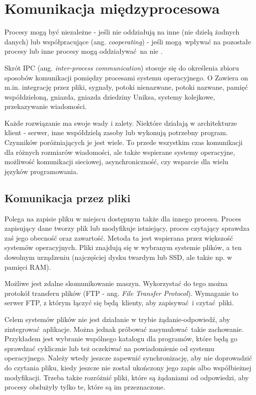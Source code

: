 \chapter{Komunikacja międzyprocesowa}

Procesy mogą być niezależne - jeśli nie oddziałują na inne (nie dzielą żadnych danych) lub współpracujące (ang. \textit{cooperating}) - jeśli mogą wpływać na pozostałe procesy lub inne procesy mogą oddziaływać na nie \cite{Silber06}.

Skrót IPC (ang. \textit{inter-process communication}) stosuje się do określenia zbioru sposobów komunikacji pomiędzy procesami systemu operacyjnego. O Zawiera on m.in. integrację przez pliki, sygnały, potoki nienazwane, potoki nazwane, pamięć współdzieloną, gniazda, gniazda dziedziny Uniksa, systemy kolejkowe, przekazywanie wiadomości.

Każde rozwiązanie ma swoje wady i zalety. Niektóre działają w architekturze klient - serwer, inne współdzielą zasoby lub wykonują potrzebny program. Czynników poróżniających je jest wiele. To przede wszystkim czas komunikacji dla różnych rozmiarów wiadomości, ale także wspierane systemy operacyjne, możliwość komunikacji sieciowej, asynchroniczność, czy wsparcie dla wielu języków programowania.


\section{Komunikacja przez pliki}

Polega na zapisie pliku w miejscu dostępnym także dla innego procesu. Proces zapisujący dane tworzy plik lub modyfikuje istniejący, proces czytający sprawdza zaś jego obecność oraz zawartość. Metoda ta jest wspierana przez większość systemów operacyjnych. Pliki znajdują się w wybranym systemie plików, a ten dowolnym urządzeniu (najczęściej dysku twardym lub SSD, ale także np. w pamięci RAM).

Możliwe jest zdalne skomunikowanie maszyn. Wykorzystać do tego można protokół transferu plików (FTP - ang. \textit{File Transfer Protocol}). Wymaganie to serwer FTP, z którym łączyć się będą klienty, aby zapisywać i czytać pliki.

Celem systemów plików nie jest działanie w trybie żądanie-odpowiedź, aby zintegrować aplikacje. Można jednak próbować zasymulować takie zachowanie. Przykładem jest wybranie wspólnego katalogu dla programów, które będą go sprawdzać cyklicznie lub też oczekiwać na powiadomienie od systemu operacyjnego. Należy wtedy jeszcze zapewnić synchronizację, aby nie doprowadzić do czytania pliku, kiedy jeszcze nie został ukończony jego zapis albo współbieżnej modyfikacji. Trzeba także rozróżnić pliki, które są żądaniami od odpowiedzi, aby procesy obsłużyły tylko te, które są im przeznaczone.


